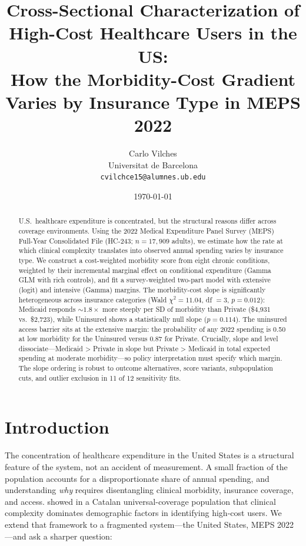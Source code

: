 \documentclass[11pt,a4paper]{article}
\title{Cross-Sectional Characterization of High-Cost Healthcare Users in the US:\\
       How the Morbidity-Cost Gradient Varies by Insurance Type in MEPS 2022}
\author{Carlo Vilches \\ Universitat de Barcelona \\ \texttt{cvilchce15@alumnes.ub.edu}}
\date{\today}
\begin{document}
\maketitle

\begin{abstract}
\noindent
U.S.\ healthcare expenditure is concentrated, but the structural reasons differ across coverage environments. Using the 2022 Medical Expenditure Panel Survey (MEPS) Full-Year Consolidated File (HC-243; $n = 17{,}909$ adults), we estimate how the rate at which clinical complexity translates into observed annual spending varies by insurance type. We construct a cost-weighted morbidity score from eight chronic conditions, weighted by their incremental marginal effect on conditional expenditure (Gamma GLM with rich controls), and fit a survey-weighted two-part model with extensive (logit) and intensive (Gamma) margins. The morbidity-cost slope is significantly heterogeneous across insurance categories (Wald $\chi^2 = 11.04$, df $= 3$, $p = 0.012$): Medicaid responds $\sim 1.8\times$ more steeply per SD of morbidity than Private (\$4{,}931 vs.\ \$2{,}723), while Uninsured shows a statistically null slope ($p = 0.114$). The uninsured access barrier sits at the extensive margin: the probability of any 2022 spending is 0.50 at low morbidity for the Uninsured versus 0.87 for Private. Crucially, slope and level dissociate---Medicaid > Private in slope but Private > Medicaid in total expected spending at moderate morbidity---so policy interpretation must specify which margin. The slope ordering is robust to outcome alternatives, score variants, subpopulation cuts, and outlier exclusion in 11 of 12 sensitivity fits.
\end{abstract}

\section{Introduction}

The concentration of healthcare expenditure in the United States is a structural feature of the system, not an accident of measurement. A small fraction of the population accounts for a disproportionate share of annual spending, and understanding \emph{why} requires disentangling clinical morbidity, insurance coverage, and access. \citet{maynou2023} showed in a Catalan universal-coverage population that clinical complexity dominates demographic factors in identifying high-cost users. We extend that framework to a fragmented system---the United States, MEPS 2022---and ask a sharper question:
\end{document}
